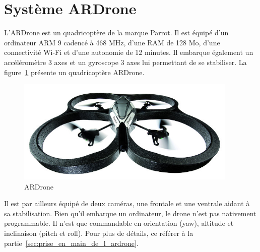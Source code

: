     \section{Système ARDrone}
        L'ARDrone est un quadricoptère de la marque Parrot. Il est équipé d'un ordinateur ARM 9 cadencé à 468 MHz, d'une RAM de 128 Mo, d'une connectivité Wi-Fi et d'une autonomie de 12 minutes. Il embarque également un accéléromètre 3 axes et un gyroscope 3 axes lui permettant de se stabiliser. La figure~\ref{fig:ardrone} présente un quadricoptère ARDrone.

        \begin{figure}[h]
          \centering
          \includegraphics[height=5cm]{images/parrot_ARDrone.jpg}
          \caption{ARDrone}
          \label{fig:ardrone}
        \end{figure}

        Il est par ailleurs équipé de deux caméras, une frontale et une ventrale aidant à sa stabilisation. Bien qu'il embarque un ordinateur, le drone n'est pas nativement programmable. Il n'est que commandable en orientation (yaw), altitude et inclinaison (pitch et roll). Pour plus de détails, ce référer à la partie~\ref{sec:prise_en_main_de_l_ardrone}.

